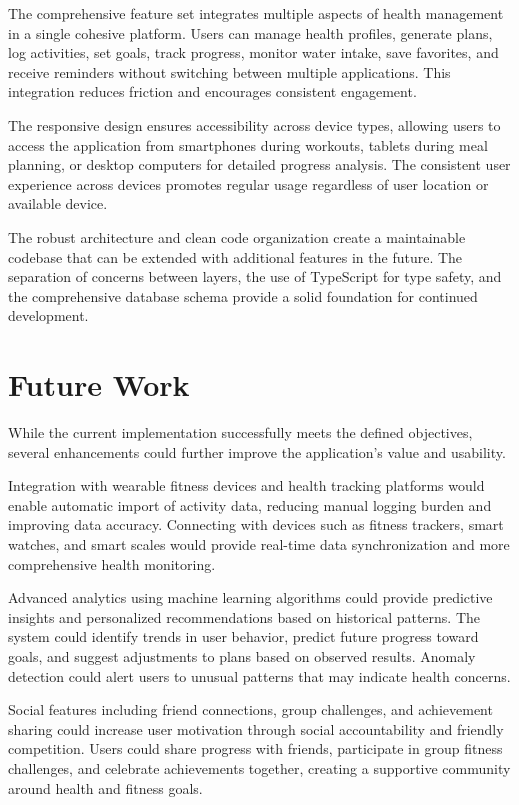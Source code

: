 The comprehensive feature set integrates multiple aspects of health management in a single cohesive platform. Users can manage health profiles, generate plans, log activities, set goals, track progress, monitor water intake, save favorites, and receive reminders without switching between multiple applications. This integration reduces friction and encourages consistent engagement.

The responsive design ensures accessibility across device types, allowing users to access the application from smartphones during workouts, tablets during meal planning, or desktop computers for detailed progress analysis. The consistent user experience across devices promotes regular usage regardless of user location or available device.

The robust architecture and clean code organization create a maintainable codebase that can be extended with additional features in the future. The separation of concerns between layers, the use of TypeScript for type safety, and the comprehensive database schema provide a solid foundation for continued development.

\section{Future Work}

While the current implementation successfully meets the defined objectives, several enhancements could further improve the application's value and usability.

Integration with wearable fitness devices and health tracking platforms would enable automatic import of activity data, reducing manual logging burden and improving data accuracy. Connecting with devices such as fitness trackers, smart watches, and smart scales would provide real-time data synchronization and more comprehensive health monitoring.

Advanced analytics using machine learning algorithms could provide predictive insights and personalized recommendations based on historical patterns. The system could identify trends in user behavior, predict future progress toward goals, and suggest adjustments to plans based on observed results. Anomaly detection could alert users to unusual patterns that may indicate health concerns.

Social features including friend connections, group challenges, and achievement sharing could increase user motivation through social accountability and friendly competition. Users could share progress with friends, participate in group fitness challenges, and celebrate achievements together, creating a supportive community around health and fitness goals.

